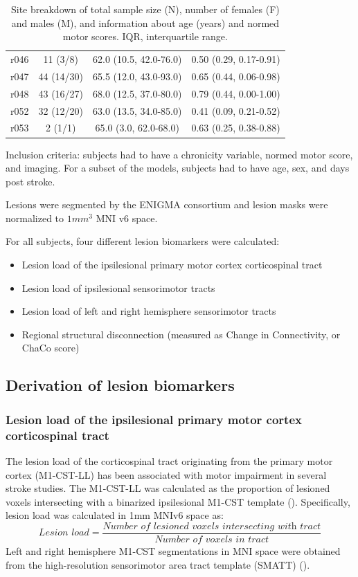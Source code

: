 \documentclass[10pt]{article}
\begin{document}
\begin{table}
\begin{tabular}{cccc}
r046 &      11 (3/8) &        62.0 (10.5, 42.0-76.0) &                   0.50 (0.29, 0.17-0.91) \\
r047 &    44 (14/30) &        65.5 (12.0, 43.0-93.0) &                   0.65 (0.44, 0.06-0.98) \\
r048 &    43 (16/27) &        68.0 (12.5, 37.0-80.0) &                   0.79 (0.44, 0.00-1.00) \\
r052 &    32 (12/20) &        63.0 (13.5, 34.0-85.0) &                   0.41 (0.09, 0.21-0.52) \\
r053 &       2 (1/1) &         65.0 (3.0, 62.0-68.0) &                   0.63 (0.25, 0.38-0.88) \\
\bottomrule
\end{tabular}
\caption{Site breakdown of total sample size (N), number of females (F) and males (M), and information about age (years) and normed motor scores. IQR, interquartile range.}
\end{table}


Inclusion criteria: subjects had to have a chronicity variable, normed motor score, and imaging.
For a subset of the models, subjects had to have age, sex, and days post stroke.

Lesions were segmented by the ENIGMA consortium and lesion masks were normalized to $1mm^3$ MNI v6 space. 


For all subjects, four different lesion biomarkers were calculated:
\begin{itemize}
\item Lesion load of the ipsilesional primary motor cortex corticospinal tract
\item Lesion load of ipsilesional sensorimotor tracts
\item Lesion load of left and right hemisphere sensorimotor tracts
\item Regional structural disconnection (measured as Change in Connectivity, or ChaCo score)
\end{itemize}


\subsection{Derivation of lesion biomarkers}
\subsubsection{Lesion load of the ipsilesional primary motor cortex corticospinal tract}
The lesion load of the corticospinal tract originating from the primary motor cortex (M1-CST-LL) has been associated with motor impairment in several stroke studies. The M1-CST-LL was calculated as the proportion of lesioned voxels intersecting with a binarized ipsilesional M1-CST template (\cite{Zhu2010-qh}). Specifically, lesion load was calculated in 1mm MNIv6 space as:
\begin{equation}
    \textit{Lesion load} = \frac{\textit{Number of lesioned voxels intersecting with  tract}}{\textit{Number of voxels in tract}}
\end{equation}
Left and right hemisphere M1-CST segmentations in MNI space were obtained from the high-resolution sensorimotor area tract template (SMATT) (\cite{Archer2018-ti}). 
 
\end{document}
